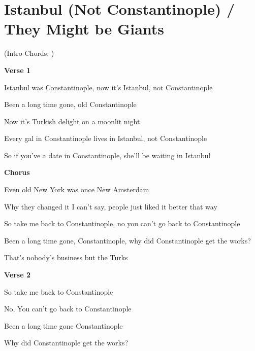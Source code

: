 \section{Istanbul (Not Constantinople) / They Might be Giants}\label{sec:istanbulnotconstantinople}
  
  \Aminor
  \Eseven
  \Dminor
  \BminorSeven
  \Eminor
  
(Intro Chords:          )

\textbf{Verse 1}
                                 
Istanbul was Constantinople, now it's Istanbul, not Constantinople

Been a long time gone, old Constantinople

Now it's Turkish delight on a moonlit night

Every gal in Constantinople lives in Istanbul, not Constantinople

So if you've a date in Constantinople, she'll be waiting in Istanbul

\textbf{Chorus}

Even old New York was once New Amsterdam

Why they changed it I can't say, people just liked it better that way

So take me back to Constantinople, no you can't go back to Constantinople

Been a long time gone,  Constantinople, why did Constantinople get the works?

That's nobody's business but the Turks

\textbf{Verse 2}
                         
So take me back to Constantinople

No, You can't go back to Constantinople
         
Been a long time gone Constantinople

Why did Constantinople get the works?

